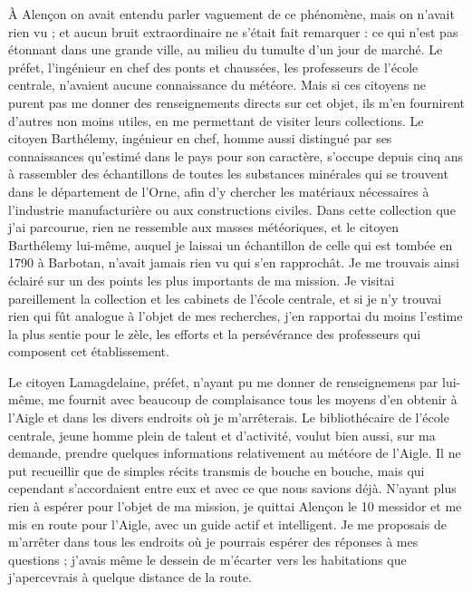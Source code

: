 \documentclass[a4paper, 11pt, oneside, polutonikogreek, french]{article}
\begin{document}
À Alençon on avait entendu parler vaguement de ce phénomène, mais on n'avait rien vu ; et aucun bruit extraordinaire ne s'était fait remarquer : ce qui n'est pas étonnant dans une grande ville, au milieu du tumulte d'un jour de marché. Le préfet, l'ingénieur en chef des ponts et chaussées, les professeurs de l'école centrale, n'avaient aucune connaissance du météore. Mais si ces citoyens ne purent pas me donner des renseignements directs sur cet objet, ils m'en fournirent d'autres non moins utiles, en me permettant de visiter leurs collections. Le citoyen Barthélemy, ingénieur en chef, homme aussi distingué par ses connaissances qu'estimé dans le pays pour son caractère, s'occupe depuis cinq ans à rassembler des échantillons de toutes les substances minérales qui se trouvent dans le département de l'Orne, afin d'y chercher les matériaux nécessaires à l'industrie manufacturière ou aux constructions civiles. Dans cette collection que j'ai parcourue, rien ne ressemble aux masses météoriques, et le citoyen Barthélemy lui-même, auquel je laissai un échantillon de celle qui est tombée en 1790 à Barbotan, n'avait jamais rien vu qui s'en rapprochât. Je me trouvais ainsi éclairé sur un des points les plus importants de ma mission. Je visitai pareillement la collection et les cabinets de l'école centrale, et si je n'y trouvai rien qui fût analogue à l'objet de mes recherches, j'en rapportai du moins l'estime la plus sentie pour le zèle, les efforts et la persévérance des professeurs qui composent cet établissement.

Le citoyen Lamagdelaine, préfet, n'ayant pu me donner de renseignemens par lui-même, me fournit avec beaucoup de complaisance tous les moyens d'en obtenir à l'Aigle et dans les divers endroits où je m'arrêterais. Le bibliothécaire de l'école centrale, jeune homme plein de talent et d'activité, voulut bien aussi, sur ma demande, prendre quelques informations relativement au météore de l'Aigle. Il ne put recueillir que de simples récits transmis de bouche en bouche, mais qui cependant s'accordaient entre eux et avec ce que nous savions déjà. N'ayant plus rien à espérer pour l'objet de ma mission, je quittai Alençon le 10 messidor et me mis en route pour l'Aigle, avec un guide actif et intelligent. Je me proposais de m'arrêter dans tous les endroits où je pourrais espérer des réponses à mes questions ; j'avais même le dessein de m'écarter vers les habitations que j'apercevrais à quelque distance de la route.
\end{document}
